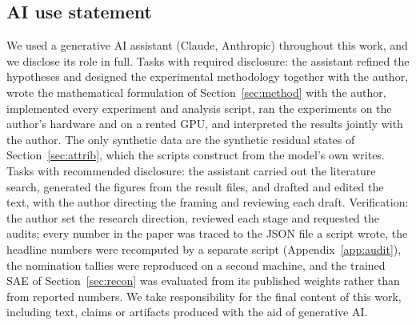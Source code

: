 \subsection*{AI use statement}
We used a generative AI assistant (Claude, Anthropic) throughout this work, and we disclose its role in full. Tasks with required disclosure: the assistant refined the hypotheses and designed the experimental methodology together with the author, wrote the mathematical formulation of Section~\ref{sec:method} with the author, implemented every experiment and analysis script, ran the experiments on the author's hardware and on a rented GPU, and interpreted the results jointly with the author. The only synthetic data are the synthetic residual states of Section~\ref{sec:attrib}, which the scripts construct from the model's own writes. Tasks with recommended disclosure: the assistant carried out the literature search, generated the figures from the result files, and drafted and edited the text, with the author directing the framing and reviewing each draft. Verification: the author set the research direction, reviewed each stage and requested the audits; every number in the paper was traced to the JSON file a script wrote, the headline numbers were recomputed by a separate script (Appendix~\ref{app:audit}), the nomination tallies were reproduced on a second machine, and the trained SAE of Section~\ref{sec:recon} was evaluated from its published weights rather than from reported numbers. We take responsibility for the final content of this work, including text, claims or artifacts produced with the aid of generative AI.

